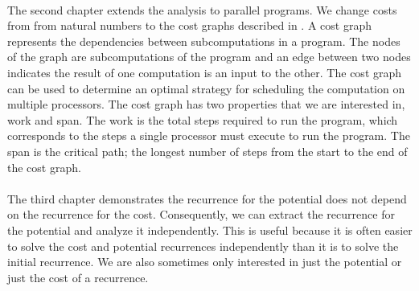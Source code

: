 \paragraph{}
The second chapter extends the analysis to parallel programs. We change costs from
from natural numbers to the cost graphs described in \citet{Harper2012PFPL}. A cost
graph represents the dependencies between subcomputations in a program. The
nodes of the graph are subcomputations of the program and an edge between two
nodes indicates the result of one computation is an input to the other. The
cost graph can be used to determine an optimal strategy for scheduling the
computation on multiple processors. The cost graph has two properties that we
are interested in, work and span. The work is the total steps required to run
the program, which corresponds to the steps a single processor must execute to
run the program. The span is the critical path; the longest number of steps
from the start to the end of the cost graph.

\paragraph{}
The third chapter demonstrates the recurrence for the potential does not depend on
the recurrence for the cost. Consequently, we can extract the recurrence for the
potential and analyze it independently. This is useful because it is often
easier to solve the cost and potential recurrences independently than it is to
solve the initial recurrence. We are also sometimes only interested in just the
potential or just the cost of a recurrence.

